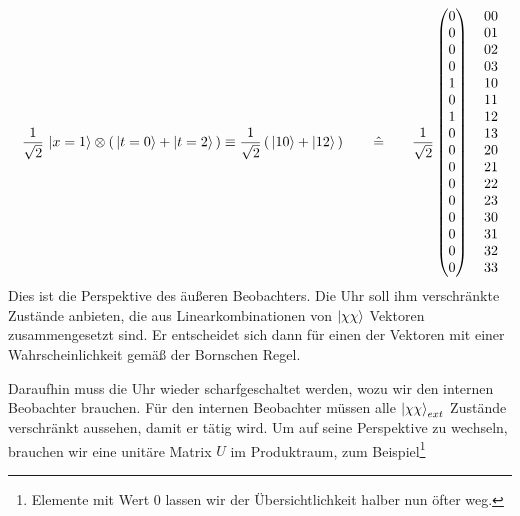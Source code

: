 \documentclass[12pt]{article}
\begin{document}
\begin{equation*}
\frac{1}{\sqrt{2}}\, \ket{x=1}\otimes \left(\,\ket{t=0} + \ket{t=2} \,\right) \equiv 
\frac{1}{\sqrt{2}} \left(\, \ket{10} + \ket{12} \,\right)
\quad\quad\hat{=}\quad\quad
\frac{1}{\sqrt{2}}
\begin{pmatrix}
0 \\ 0 \\ 0 \\ 0 \\ 1 \\ 0 \\ 1 \\ 0 \\ 0 \\ 0 \\ 0 \\ 0 \\ 0 \\ 0 \\ 0 \\ 0
\end{pmatrix}
\quad
\begin{matrix}
00 \\ 01 \\ 02 \\ 03 \\ 10 \\ 11 \\ 12 \\ 13 \\ 20 \\ 21 \\ 22 \\ 23 \\ 30 \\ 31 \\ 32 \\ 33 
\end{matrix}
\end{equation*}
Dies ist die Perspektive des äußeren Beobachters. Die Uhr soll ihm verschränkte Zustände anbieten, die aus Linearkombinationen von $\ket{\chi\chi}$ Vektoren zusammengesetzt sind. Er entscheidet sich dann für einen der Vektoren mit einer Wahrscheinlichkeit gemäß der Bornschen Regel. 

Daraufhin muss die Uhr wieder scharfgeschaltet werden, wozu wir den internen Beobachter brauchen. Für den internen Beobachter müssen alle $\ket{\chi\chi}_{ext}$ Zustände verschränkt aussehen, damit er tätig wird. Um auf seine Perspektive zu wechseln, brauchen wir eine unitäre Matrix $U$ im Produktraum, zum Beispiel\footnote{Elemente mit Wert 0 lassen wir der Übersichtlichkeit halber nun öfter weg.}
\end{document}
